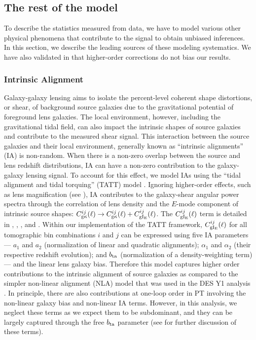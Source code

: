 \documentclass[aps, prd,twocolumn,superscriptaddress,nofootinbib,preprintnumbers]{revtex4-1}
\newcommand{\IR}[1]{{\color{red}[\textbf{Note for IR}: #1]}}
\begin{document}
\subsection{The rest of the model}
\label{sec:model_rest}

To describe the statistics measured from data, we have to model various other physical phenomena that contribute to the signal to obtain unbiased inferences. In this section, we describe the leading sources of these modeling systematics. We have also validated in \cite{y3-generalmethods} that higher-order corrections do not bias our results. 

\subsubsection{Intrinsic Alignment} 
Galaxy-galaxy lensing aims to isolate the percent-level coherent shape distortions, or shear, of background source galaxies due to the gravitational potential of foreground lens galaxies. The local environment, however, including the gravitational tidal field, can also impact the intrinsic shapes of source galaxies and contribute to the measured shear signal. This interaction between the source galaxies and their local environment, generally known as ``intrinsic alignments'' (IA) is non-random. When there is a non-zero overlap between the source and lens redshift distributions, IA can have a non-zero contribution to the galaxy-galaxy lensing signal. To account for this effect, we model IAs using the ``tidal alignment and tidal torquing'' (TATT) model \citep{Blazek_2019}. Ignoring higher-order effects, such as lens magnification (see \citep{y3-gglensing,y3-2x2ptmagnification}), IA contributes to the galaxy-shear angular power spectra through the correlation of lens density and the $E$-mode component of intrinsic source shapes: $C^{ij}_{\rm g\kappa}(\ell) \to C^{ij}_{\rm g\kappa}(\ell) + C^{ij}_{\rm gI_{\rm E}}(\ell)$. The $C^{ij}_{\rm gI_{\rm E}}(\ell)$ term is detailed in \citet*{y3-generalmethods}, \citet*{y3-cosmicshear2}, \citet*{y3-gglensing}, and \citet{Blazek_2019}. Within our implementation of the TATT framework, $C^{ij}_{\rm gI_{\rm E}}(\ell)$ for all tomographic bin combinations $i$ and $j$ can be expressed using five IA parameters --- $a_1$ and $a_2$ (normalization of linear and quadratic alignments); $\alpha_1$ and $\alpha_2$ (their respective redshift evolution); and $b_{\rm ta}$ (normalization of a density-weighting term) --- and the linear lens galaxy bias. Therefore this model captures higher order contributions to the intrinsic alignment of source galaxies as compared to the simpler non-linear alignment (NLA) model that was used in the DES Y1 analysis \citep{Krause2017,Abbott_2018}. In principle, there are also contributions at one-loop order in PT involving the non-linear galaxy bias and non-linear IA terms. However, in this analysis, we neglect these terms as we expect them to be subdominant, and they can be largely captured through the free $b_{\rm ta}$ parameter (see \citep{Blazek_2015} for further discussion of these terms). 
\end{document}
